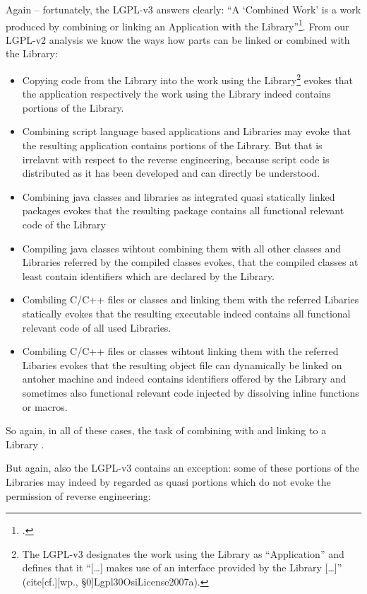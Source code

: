 Again -- fortunately, the LGPL-v3 answers clearly: \enquote{A \enquote{Combined
Work} is a work produced by combining or linking an Application with the
Library}\footcite[cf.][\nopage wp., §0]{Lgpl30OsiLicense2007a}. From our LGPL-v2
analysis we know the ways how parts can be linked or combined with the Library: 
\begin{itemize}
  \item Copying code from the Library into the work using the
  Library\footnote{The LGPL-v3 designates the work using the Library as
  \enquote{Application} and defines that it \enquote{[\ldots] makes use of an
  interface provided by the Library [\ldots]} (cite[cf.][\nopage wp.,
  §0]{Lgpl30OsiLicense2007a}).} evokes that the application respectively the
  work using the Library indeed contains portions of the Library.
  \item Combining script language based applications and Libraries may evoke
  that the resulting application contains portions of the Library. But that is
  irrelavnt with respect to the reverse engineering, because script code is
  distributed as it has been developed and can directly be understood.
  \item Combining java classes and libraries as integrated quasi
  statically linked packages evokes that the resulting package contains all
  functional relevant code of the Library
  \item Compiling java classes wihtout combining them with all other classes and
  Libraries referred by the compiled classes evokes, that the compiled classes
  at least contain identifiers which are declared by the Library.
  \item Combiling C/C++ files or classes and linking them with the
  referred Libaries statically evokes that the resulting executable indeed
  contains all functional relevant code of all used Libraries.
  \item Combiling C/C++ files or classes wihtout linking them with the
  referred Libaries evokes that the resulting object file can dynamically be
  linked on antoher machine and indeed contains identifiers offered by the
  Library and sometimes also functional relevant code injected by dissolving
  inline functions or macros.
\end{itemize}

So again, in all of these cases, the task of combining with and linking to a
Library .

But again, also the LGPL-v3 contains an exception: some of these portions of the
Libraries may indeed by regarded as quasi portions which do not evoke the
permission of reverse engineering:

